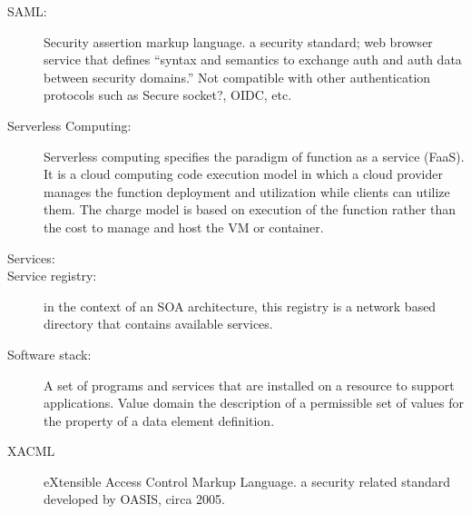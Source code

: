 \begin{description}
\item[SAML:] Security assertion markup language. a security standard;
  web browser service that defines ``syntax and semantics to exchange
  auth and auth data between security domains.'' Not compatible with
  other authentication protocols such as Secure socket?, OIDC, etc.

\item[Serverless Computing:] Serverless computing specifies the
  paradigm of function as a service (FaaS). It is a cloud computing
  code execution model in which a cloud provider manages the function
  deployment and utilization while clients can utilize them. The
  charge model is based on execution of the function rather than the
  cost to manage and host the VM or container.

\item[Services:] 

\item[Service registry:] in the context of an SOA architecture, this
  registry is a network based directory that contains available
  services.

\item[Software stack:] A set of programs and services that are
  installed on a resource to support applications.  Value domain the
  description of a permissible set of values for the property of a
  data element definition.

\item[XACML] eXtensible Access Control Markup Language. a security
  related standard developed by OASIS, circa 2005.

\end{description}


